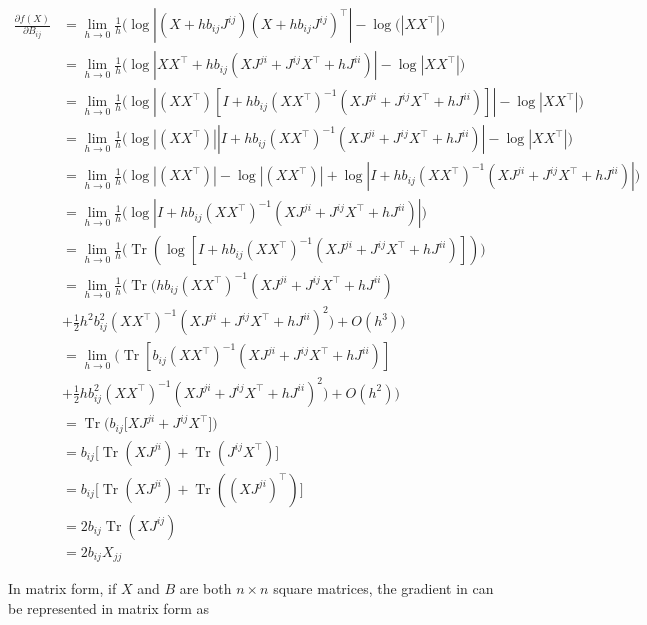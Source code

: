 \documentclass[12pt]{article}
\theoremstyle{definition}
\DeclareMathOperator{\Tr}{Tr}
\begin{document}
\begin{equation}
    \label{eqn:gradLogDetElement}
    \begin{split}
        \frac{\partial f(X)}{\partial B_{ij}} &= \lim_{h \to 0} \frac{1}{h}\bigg(\log|(X + hb_{ij}J^{ij}) (X + hb_{ij}J^{ij})^\top| - \log(|XX^\top| \bigg) \\
        &= \lim_{h \to 0} \frac{1}{h} \bigg(\log|XX^\top + hb_{ij}(XJ^{ji} + J^{ij}X^\top + hJ^{ii})| - \log|XX^\top| \bigg) \\ 
        & = \lim_{h \to 0} \frac{1}{h} \bigg(\log|(XX^\top)[I + hb_{ij}(XX^\top)^{-1}(XJ^{ji} + J^{ij}X^\top + hJ^{ii})]| - \log|XX^\top| \bigg) \\ 
        & = \lim_{h \to 0} \frac{1}{h} \bigg(\log|(XX^\top)||I + hb_{ij}(XX^\top)^{-1}(XJ^{ji} + J^{ij}X^\top + hJ^{ii})| - \log|XX^\top| \bigg) \\ 
        & = \lim_{h \to 0} \frac{1}{h} \bigg( \log|(XX^\top)| - \log|(XX^\top)| + \log|I + hb_{ij}(XX^\top)^{-1}(XJ^{ji} + J^{ij}X^\top + hJ^{ii})| \bigg) \\
        & = \lim_{h \to 0} \frac{1}{h} \bigg(\log|I + hb_{ij}(XX^\top)^{-1}(XJ^{ji} + J^{ij}X^\top + hJ^{ii})| \bigg) \\
        & = \lim_{h \to 0} \frac{1}{h} \bigg( \Tr (\log[I + hb_{ij}(XX^\top)^{-1}(XJ^{ji} + J^{ij}X^\top + hJ^{ii})]) \bigg) \\ 
        & = \lim_{h \to 0} \frac{1}{h} \bigg( \Tr (hb_{ij}(XX^\top)^{-1}(XJ^{ji} + J^{ij}X^\top + hJ^{ii}) \\ 
        & + \frac{1}{2} h^2 b_{ij}^2 (XX^\top)^{-1}(XJ^{ji} + J^{ij}X^\top + hJ^{ii})^2) + O(h^3) \bigg) \\ 
        & = \lim_{h \to 0} \bigg(\Tr [b_{ij}(XX^\top)^{-1}(XJ^{ji} + J^{ij}X^\top + hJ^{ii})] \\ 
        & + \frac{1}{2} h b_{ij}^2 (XX^\top)^{-1}(XJ^{ji} + J^{ij}X^\top + hJ^{ii})^2) + O(h^2) \bigg) \\ 
        & = \Tr\big(b_{ij}[XJ^{ji} + J^{ij}X^\top\big]) \\ 
        & = b_{ij}\big[\Tr(XJ^{ji}) + \Tr(J^{ij}X^\top)\big] \\ 
        & = b_{ij}\big[\Tr(XJ^{ji}) + \Tr((XJ^{ji})^\top)\big] \\ 
        & = 2b_{ij} \Tr(XJ^{ij}) \\ 
        & = 2 b_{ij}X_{jj}
    \end{split}
\end{equation}

In matrix form, if $X$ and $B$ are both $n \times n$ square matrices, the gradient in can be represented in matrix form as
\end{document}
